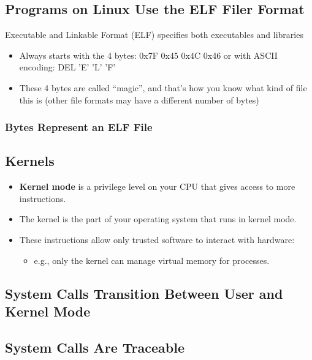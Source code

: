 \subsection{Programs on Linux Use the ELF Filer Format}
\begin{definition}
    Executable and Linkable Format (ELF) specifies both executables and libraries
    \begin{itemize}
        \item Always starts with the 4 bytes: 0x7F 0x45 0x4C 0x46 or with ASCII encoding: DEL 'E' 'L' 'F'
        \item These 4 bytes are called “magic”, and that’s how you know what kind of file this is (other file formats may have a different number of bytes)
    \end{itemize}
\end{definition}

\subsubsection{Bytes Represent an ELF File}
\begin{definition}
    
\end{definition}

\subsection{Kernels}
\begin{definition}
    \begin{itemize}
        \item \textbf{Kernel mode} is a privilege level on your CPU that gives access to more instructions.
        \item The kernel is the part of your operating system that runs in kernel mode.
        \item These instructions allow only trusted software to interact with hardware:
        \begin{itemize}
            \item e.g., only the kernel can manage virtual memory for processes.
        \end{itemize}
    \end{itemize}
\end{definition}

\subsection{System Calls Transition Between User and Kernel Mode}
\begin{definition}
    
\end{definition}

\subsection{System Calls Are Traceable}